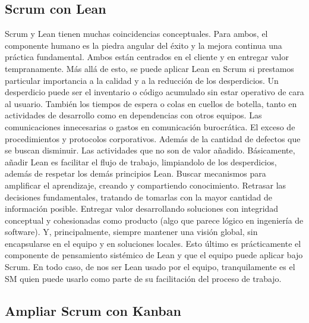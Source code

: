 \subsection{Scrum con Lean}

Scrum y Lean tienen muchas coincidencias conceptuales. Para ambos, el componente humano es la piedra angular del éxito y la mejora continua una práctica fundamental. Ambos están centrados en el cliente y en entregar valor tempranamente. Más allá de esto, se puede aplicar Lean en Scrum si prestamos particular importancia a la calidad y a la reducción de los desperdicios. Un desperdicio puede ser el inventario o código acumulado sin estar operativo de cara al usuario. También los tiempos de espera o colas en cuellos de botella, tanto en actividades de desarrollo como en dependencias con otros equipos. Las comunicaciones innecesarias o gastos en comunicación burocrática. El exceso de procedimientos y protocolos corporativos. Además de la cantidad de defectos que se buscan disminuir. Las actividades que no son de valor añadido. Básicamente, añadir Lean es facilitar el flujo de trabajo, limpiandolo de los desperdicios, además de respetar los demás principios Lean. Buscar mecanismos para amplificar el aprendizaje, creando y compartiendo conocimiento. Retrasar las decisiones fundamentales, tratando de tomarlas con la mayor cantidad de información posible. Entregar valor desarrollando soluciones con integridad conceptual y cohesionadas como producto (algo que parece lógico en ingeniería de software). Y, principalmente, siempre mantener una visión global, sin encapsularse en el equipo y en soluciones locales. Esto último es prácticamente el componente de pensamiento sistémico de Lean y que el equipo puede aplicar bajo Scrum. En todo caso, de nos ser Lean usado por el equipo, tranquilamente es el SM quien puede usarlo como parte de su facilitación del proceso de trabajo.

\subsection{Ampliar Scrum con Kanban}

